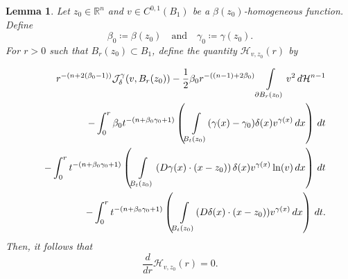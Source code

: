 \documentclass[reqno,11pt]{amsart}
\newtheorem{lemma}{Lemma}[section]
\newcommand{\1}{\mathds{1}}
\numberwithin{equation}{section}
\begin{document}
\begin{lemma}\label{bhv with homog functions}
Let $z_0 \in \mathbb{R}^n$ and $v \in C^{0,1}(B_1)$ be a $\beta(z_0)$-homogeneous function. Define
$$
	\beta_0 \coloneqq \beta(z_0) \quad \text{and} \quad \gamma_0 \coloneqq \gamma(z_0).
$$
For $r>0$ such that $B_r(z_0) \subset B_1$, define the quantity $\mathcal{H}_{v,z_0}(r)$ by

\begin{eqnarray}
\displaystyle  &   & \displaystyle r^{-(n + 2(\beta_0-1))}\mathcal{J}_\delta^\gamma(v,B_r(z_0)) - \frac{1}{2}\beta_0 r^{-((n-1) + 2\beta_0)}\int\limits_{\partial B_r(z_0)}v^2\, d\mathcal{H}^{n-1} \nonumber\\
&  & - \int_{0}^{r} \beta_0 t^{-(n+\beta_0 \gamma_0 +1)}\left(\int\limits_{B_t(z_0)}(\gamma(x)-\gamma_0)\delta(x)v^{\gamma(x)} \, dx\right)\, dt  \nonumber \\
&  & - \int_{0}^{r} t^{-(n+\beta_0 \gamma_0 + 1)}\left(\int\limits_{B_t(z_0)}\left(D\gamma(x)\cdot (x-z_0)\right) \delta(x) v^{\gamma(x)}  \ln(v) \, dx\right)\, dt \nonumber \\
&  & -  \int_{0}^r t^{-(n+\beta_0 \gamma_0 + 1)} \left(\int\limits_{B_t(z_0)} (D\delta(x) \cdot (x - z_0)) v^{\gamma(x)}  \, dx\right)\, dt.\label{mon formula}
\end{eqnarray}
Then, it follows that 
$$
	\frac{d}{dr} \mathcal{H}_{v,z_0}(r) = 0.
$$
\end{lemma} 
\end{document}
